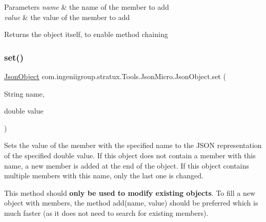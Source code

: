 \begin{DoxyParams}{Parameters}
{\em name} & the name of the member to add \\
\hline
{\em value} & the value of the member to add \\
\hline
\end{DoxyParams}
\begin{DoxyReturn}{Returns}
the object itself, to enable method chaining 
\end{DoxyReturn}
\mbox{\label{classcom_1_1ingeniigroup_1_1stratux_1_1_tools_1_1_json_micro_1_1_json_object_ab01023eca501e2218a6f1484b36c6fc5}} 
\subsubsection{\texorpdfstring{set()}{set()}\hspace{0.1cm}{\footnotesize\ttfamily [4/7]}}
{\footnotesize\ttfamily \hyperlink{classcom_1_1ingeniigroup_1_1stratux_1_1_tools_1_1_json_micro_1_1_json_object}{Json\+Object} com.\+ingeniigroup.\+stratux.\+Tools.\+Json\+Micro.\+Json\+Object.\+set (\begin{DoxyParamCaption}\item[{String}]{name,  }\item[{double}]{value }\end{DoxyParamCaption})}

Sets the value of the member with the specified name to the J\+S\+ON representation of the specified {\ttfamily double} value. If this object does not contain a member with this name, a new member is added at the end of the object. If this object contains multiple members with this name, only the last one is changed. 

This method should {\bfseries only be used to modify existing objects}. To fill a new object with members, the method {\ttfamily add(name, value)} should be preferred which is much faster (as it does not need to search for existing members). 


